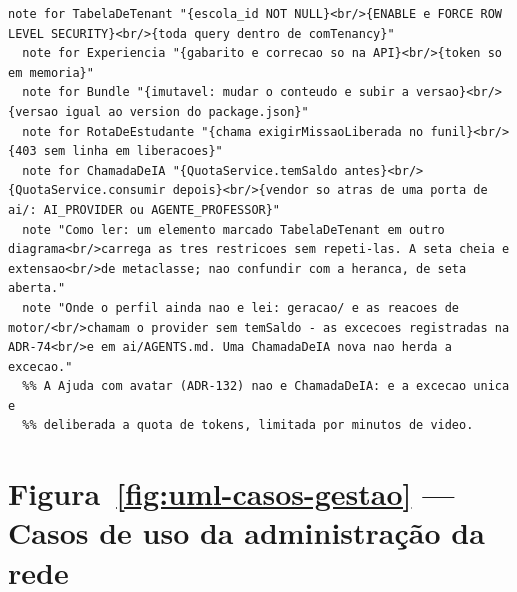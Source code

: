 \begin{lstlisting}[language=mermaid]
  note for TabelaDeTenant "{escola_id NOT NULL}<br/>{ENABLE e FORCE ROW LEVEL SECURITY}<br/>{toda query dentro de comTenancy}"
  note for Experiencia "{gabarito e correcao so na API}<br/>{token so em memoria}"
  note for Bundle "{imutavel: mudar o conteudo e subir a versao}<br/>{versao igual ao version do package.json}"
  note for RotaDeEstudante "{chama exigirMissaoLiberada no funil}<br/>{403 sem linha em liberacoes}"
  note for ChamadaDeIA "{QuotaService.temSaldo antes}<br/>{QuotaService.consumir depois}<br/>{vendor so atras de uma porta de ai/: AI_PROVIDER ou AGENTE_PROFESSOR}"
  note "Como ler: um elemento marcado TabelaDeTenant em outro diagrama<br/>carrega as tres restricoes sem repeti-las. A seta cheia e extensao<br/>de metaclasse; nao confundir com a heranca, de seta aberta."
  note "Onde o perfil ainda nao e lei: geracao/ e as reacoes de motor/<br/>chamam o provider sem temSaldo - as excecoes registradas na ADR-74<br/>e em ai/AGENTS.md. Uma ChamadaDeIA nova nao herda a excecao."
  %% A Ajuda com avatar (ADR-132) nao e ChamadaDeIA: e a excecao unica e
  %% deliberada a quota de tokens, limitada por minutos de video.
\end{lstlisting}

\section{Figura~\ref{fig:uml-casos-gestao} --- Casos de uso da administração da rede}

